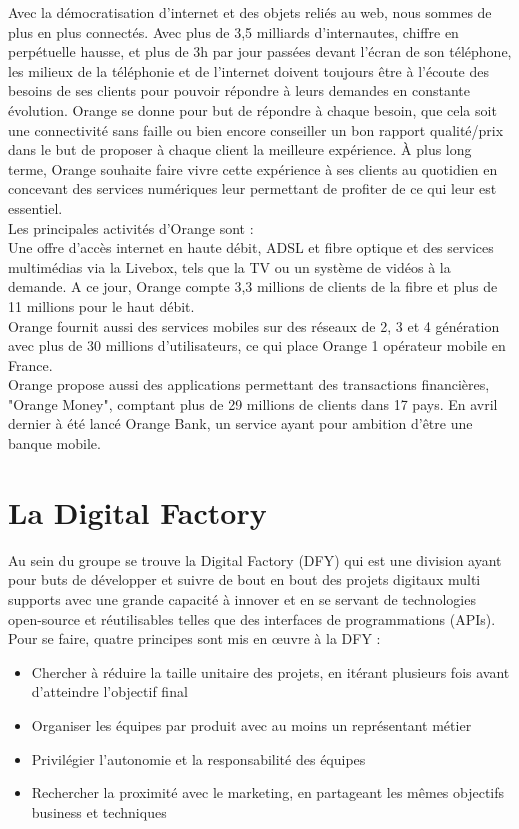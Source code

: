 Avec la démocratisation d'internet et des objets reliés au web, nous sommes de plus en plus connectés. Avec plus de 3,5 milliards d'internautes, chiffre en perpétuelle hausse, et plus de 3h par jour passées devant l'écran de son téléphone, les milieux de la téléphonie et de l'internet doivent toujours être à l'écoute des besoins de ses clients pour pouvoir répondre à leurs demandes en constante évolution. Orange se donne pour but de répondre à chaque besoin, que cela soit une connectivité sans faille ou bien encore conseiller un bon rapport qualité/prix dans le but de proposer à chaque client la meilleure expérience. À plus long terme, Orange souhaite faire vivre cette expérience à ses clients au quotidien en concevant des services numériques leur permettant de profiter de ce qui leur est essentiel. \\
Les principales activités d'Orange sont :\\
Une offre d'accès internet en haute débit, ADSL et fibre optique et des services multimédias via la Livebox, tels que la TV ou un système de vidéos à la demande. A ce jour, Orange compte 3,3 millions de clients de la fibre et plus de 11 millions pour le haut débit.\\
Orange fournit aussi des services mobiles sur des réseaux de 2, 3 et 4 génération avec plus de 30 millions d'utilisateurs, ce qui place Orange 1 opérateur mobile en France.\\
Orange propose aussi des applications permettant des transactions financières, "Orange Money", comptant plus de 29 millions de clients dans 17 pays. En avril dernier à été lancé Orange Bank, un service ayant pour ambition d'être une banque mobile.


\section{La Digital Factory}

Au sein du groupe se trouve la Digital Factory (DFY) qui est une division ayant pour buts de développer et suivre de bout en bout des projets digitaux multi supports avec une grande capacité à innover et en se servant de technologies open-source et réutilisables telles que des interfaces de programmations (APIs). Pour se faire, quatre principes sont mis en \oe{}uvre à la DFY :

\begin{itemize}
    \item Chercher à réduire la taille unitaire des projets, en itérant plusieurs fois avant 	d’atteindre l’objectif final
    \item Organiser les équipes par produit avec au moins un représentant métier
    \item Privilégier l’autonomie et la responsabilité des équipes
    \item Rechercher la proximité avec le marketing, en partageant les mêmes objectifs business et techniques
\end{itemize}

